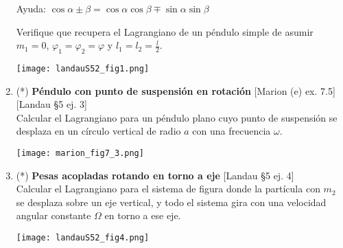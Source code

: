 \documentclass[11pt,spanish,a4paper]{article}
\begin{document}
\begin{enumerate}
\begin{minipage}[t][4.5cm]{0.7\textwidth}
Ayuda: \( \cos{\alpha \pm \beta }=\cos{ \alpha} \cos{ \beta \mp \sin \alpha} \sin{ \beta } \)

Verifique que recupera el Lagrangiano de un péndulo simple de asumir \(m_1=0\), \(\varphi_1 = \varphi_2 = \varphi\) y \(l_1 = l_2 = \frac{l}{2}\).
\end{minipage}
	\begin{minipage}[c][2.5cm][t]{0.3\textwidth}
	\texttt{[image: landauS52\_fig1.png]}
\end{minipage}



\item \begin{minipage}[t][4.5cm]{0.6\textwidth}
(*) \textbf{Péndulo con punto de suspensión en rotación} [Marion (e) ex. 7.5] [Landau \S5 ej. 3]\\
Calcular el Lagrangiano para un péndulo plano cuyo punto de suspensión se desplaza en un círculo vertical de radio \(a\) con una frecuencia \(\omega\).
\end{minipage}
	\begin{minipage}[c][2.5cm][t]{0.4\textwidth}
	\texttt{[image: marion\_fig7\_3.png]}
\end{minipage}



\item \begin{minipage}[t][4.5cm]{0.65\textwidth}
(*) \textbf{Pesas acopladas rotando en torno a eje} [Landau \S5 ej. 4]\\
Calcular el Lagrangiano para el sistema de figura donde la partícula con \(m_2\) se desplaza sobre un eje vertical, y todo el sistema gira con una velocidad angular constante \(\Omega\) en torno a ese eje.
\end{minipage}
	\begin{minipage}[c][2.5cm][t]{0.35\textwidth}
	\texttt{[image: landauS52\_fig4.png]}
\end{minipage}



\end{enumerate}
\end{document}

